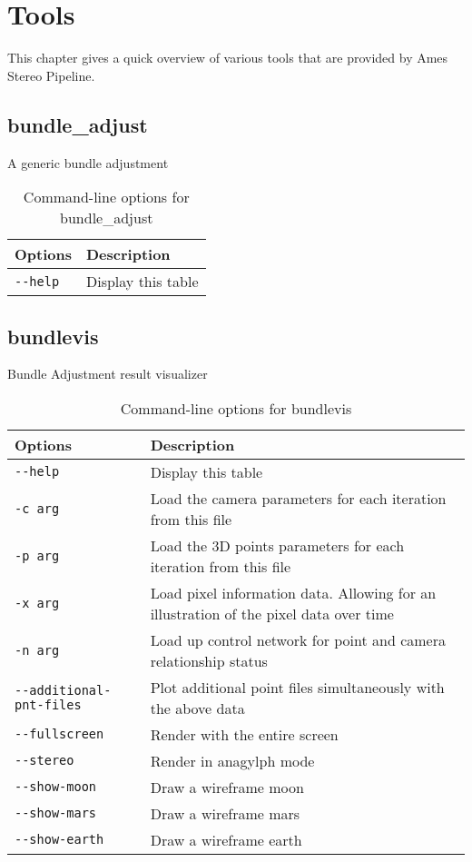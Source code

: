 \chapter{Tools}

This chapter gives a quick overview of various tools that are provided by
Ames Stereo Pipeline.

\section{bundle\_adjust}
\label{bundle_adjust}

A generic bundle adjustment

\begin{longtable}{|l|p{10cm}|}
\caption{Command-line options for bundle\_adjust}
\label{tbl:bundle_adjust}
\endfirsthead
\endhead
\endfoot
\endlastfoot
\hline
Options & Description \\ \hline \hline
\verb#--help# & Display this table \\ \hline
\end{longtable}

\section{bundlevis}
\label{bundlevis}

Bundle Adjustment result visualizer

\begin{longtable}{|l|p{10cm}|}
\caption{Command-line options for bundlevis}
\label{tbl:bundlevis}
\endfirsthead
\endhead
\endfoot
\endlastfoot
\hline
Options & Description \\ \hline \hline
\verb#--help# & Display this table \\ \hline
\verb#-c arg# & Load the camera parameters for each iteration from this file \\ \hline
\verb#-p arg# & Load the 3D points parameters for each iteration from this file \\ \hline
\verb#-x arg# & Load pixel information data. Allowing for an illustration of the pixel data over time \\ \hline
\verb#-n arg# & Load up control network for point and camera relationship status \\ \hline
\verb#--additional-pnt-files# & Plot additional point files simultaneously with the above data \\ \hline
\verb#--fullscreen# & Render with the entire screen \\ \hline
\verb#--stereo# & Render in anagylph mode \\ \hline
\verb#--show-moon# & Draw a wireframe moon \\ \hline
\verb#--show-mars# & Draw a wireframe mars \\ \hline
\verb#--show-earth# & Draw a wireframe earth \\ \hline
\end{longtable}

